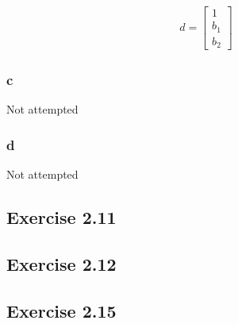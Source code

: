 \begin{align}
  d = 
  \begin{bmatrix}
    1 \\ 
    b_1 \\
    b_2    
  \end{bmatrix}
\end{align}

\subsubsection{c}
Not attempted
\subsubsection{d}
Not attempted

\subsection{Exercise 2.11}

\subsection{Exercise 2.12}

\subsection{Exercise 2.15}

